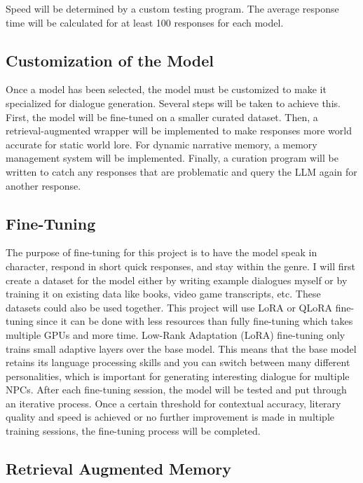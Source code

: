 \documentclass[10pt,twocolumn]{article}
\begin{document}
            \par 
            Speed will be determined by a custom testing program. The average response time will be calculated for at least 100 responses for each model.

    \subsection{Customization of the Model}

        \par 
        Once a model has been selected, the model must be customized to make it specialized for dialogue generation. Several steps will be taken to achieve this. First, the model will be fine-tuned on a smaller curated dataset. Then, a retrieval-augmented wrapper will be implemented to make responses more world accurate for static world lore. For dynamic narrative memory, a memory management system will be implemented. Finally, a curation program will be written to catch any responses that are problematic and query the LLM again for another response. 

        \subsection{Fine-Tuning}

            \par 
            The purpose of fine-tuning for this project is to have the model speak in character, respond in short quick responses, and stay within the genre. I will first create a dataset for the model either by writing example dialogues myself or by training it on existing data like books, video game transcripts, etc. These datasets could also be used together. This project will use LoRA or QLoRA fine-tuning since it can be done with less resources than fully fine-tuning which takes multiple GPUs and more time. Low-Rank Adaptation (LoRA) fine-tuning only trains small adaptive layers over the base model. This means that the base model retains its language processing skills and you can switch between many different personalities, which is important for generating interesting dialogue for multiple NPCs. After each fine-tuning session, the model will be tested and put through an iterative process. Once a certain threshold for contextual accuracy, literary quality and speed is achieved or no further improvement is made in multiple training sessions, the fine-tuning process will be completed. 

        \subsection{Retrieval Augmented Memory}
\end{document}
